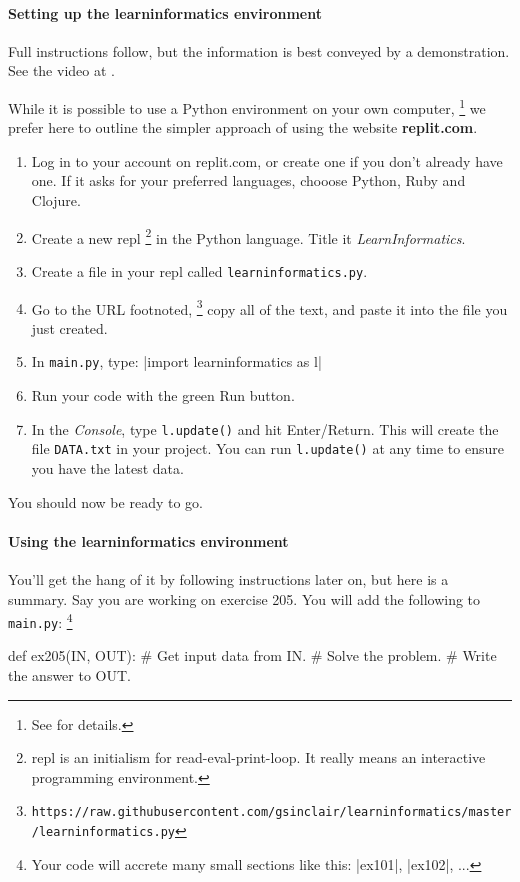 \paragraph{Setting up the learninformatics environment} Full instructions follow, but the
information is best conveyed by a demonstration. See the video at .

While it is possible to use a Python environment on your own computer,%
\footnote{See  for details.}
we prefer here to outline the simpler approach of using the website \textbf{replit.com}.

\begin{enumerate}
  \item Log in to your account on replit.com, or create one if you don't already have one.
    If it asks for your preferred languages, chooose Python, Ruby and Clojure.
  \item Create a new repl%
\footnote{repl is an initialism for read-eval-print-loop. It really means an interactive
  programming environment.}
    in the Python language. Title it \emph{LearnInformatics}.
  \item Create a file in your repl called \texttt{learninformatics.py}.
  \item Go to the URL footnoted,%
\footnote{\texttt{https://raw.githubusercontent.com/gsinclair/learninformatics/master/learninformatics.py}}
    copy all of the text, and paste it into the file you just created.
  \item In \texttt{main.py}, type: \pycode|import learninformatics as l|
  \item Run your code with the green Run button.
  \item In the \emph{Console}, type \texttt{l.update()} and hit Enter/Return. This will
    create the file \texttt{DATA.txt} in your project. You can run \texttt{l.update()} at
    any time to ensure you have the latest data.
\end{enumerate}

You should now be ready to go.

\paragraph{Using the learninformatics environment} You'll get the hang of it by following
instructions later on, but here is a summary. Say you are working on exercise 205. You
will add the following to \texttt{main.py}:%
\footnote{Your code will accrete many small sections like this: \pycode|ex101|,
  \pycode|ex102|, ...}
\begin{pythoncode}
  def ex205(IN, OUT):
    # Get input data from IN.
    # Solve the problem.
    # Write the answer to OUT.
\end{pythoncode}

